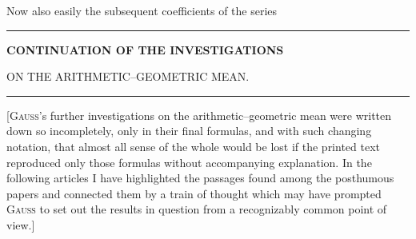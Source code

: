 \begingroup
\renewcommand{\arraystretch}{1.45}
Now also easily the subsequent coefficients of the series

\par\noindent\hfill\rule{0.25\linewidth}{0.4pt}\hfill\mbox{}\par
\clearpage{}
\begin{center}\bfseries
CONTINUATION OF THE INVESTIGATIONS

ON THE ARITHMETIC–GEOMETRIC MEAN.

\rule{0.08\linewidth}{0.3pt}
\end{center}
[\textsc{Gauss}'s further investigations on the arithmetic–geometric mean were written down so incompletely, only in their final formulas, and with such changing notation, that almost all sense of the whole would be lost if the printed text reproduced only those formulas without accompanying explanation. In the following articles I have highlighted the passages found among the posthumous papers and connected them by a train of thought which may have prompted \textsc{Gauss} to set out the results in question from a recognizably common point of view.]

